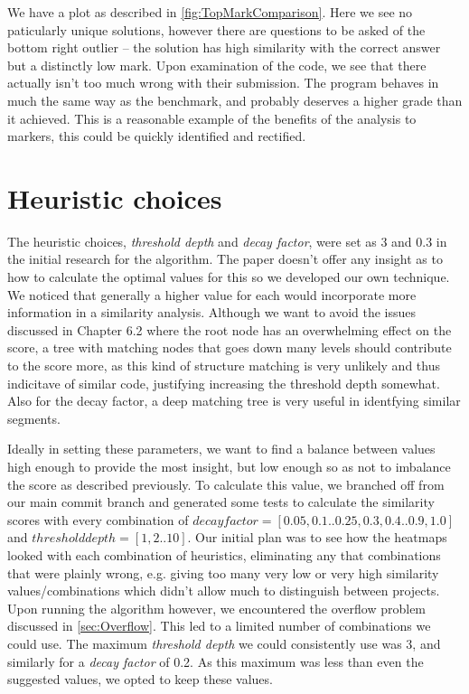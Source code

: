 We have a plot as described in \cref{fig:TopMarkComparison}. Here we see no
paticularly unique solutions, however there are questions to be asked of the
bottom right outlier -- the solution has high similarity with the correct answer
but a distinctly low mark. Upon examination of the code, we see that there actually
isn't too much wrong with their submission. The program behaves in much the same
way as the benchmark, and probably deserves a higher grade than it achieved.
This is a reasonable example of the benefits of the analysis to markers, this
could be quickly identified and rectified.

\section{Heuristic choices}
The heuristic choices, \emph{threshold depth} and \emph{decay factor}, were 
set as 3 and 0.3 in the initial research for the algorithm\cite{ParseTreeKernel}. 
The paper doesn't offer any insight as to how to calculate the optimal values
for this so we developed our own technique. We noticed that generally a higher value
for each would incorporate more information in a similarity analysis. Although we
want to avoid the issues discussed in Chapter 6.2 where the root node has
an overwhelming effect on the score, a tree with matching nodes that goes down
many levels should contribute to the score more, as this kind of structure matching
is very unlikely and thus indicitave of similar code, justifying increasing the
threshold depth somewhat. Also for the decay factor, a deep matching tree is
very useful in identfying similar segments.

Ideally in setting these parameters, we want to find a balance between values
high enough to provide the most insight, but low enough so as not to imbalance
the score as described previously. To calculate this value, we branched off
from our main commit branch and generated some tests to calculate the similarity
scores with every combination of $decay factor=[0.05, 0.1 .. 0.25, 0.3, 0.4 .. 0.9, 1.0]$
and $threshold depth=[1, 2 .. 10]$. Our initial plan was to see how the heatmaps
looked with each combination of heuristics, eliminating any that combinations
that were plainly wrong, e.g. giving too many very low or very high similarity
values/combinations which didn't allow much to distinguish between projects.
Upon running the algorithm however, we encountered the overflow problem discussed
in \cref{sec:Overflow}. This led to a limited number of combinations we could use.
The maximum \emph{threshold depth} we could consistently use was 3, and similarly for
a \emph{decay factor} of 0.2. As this maximum was less than even the suggested values,
we opted to keep these values.

